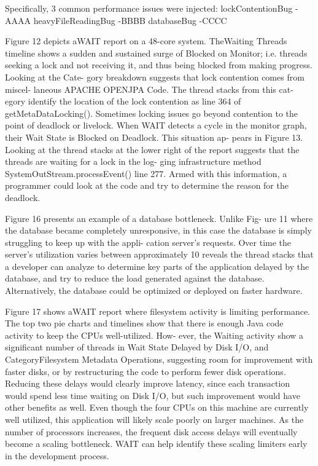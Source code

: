 \documentclass[runningheads,a4paper]{llncs}
\begin{document}
Specifically, 3 common performance issues were injected:
lockContentionBug -AAAA
heavyFileReadingBug -BBBB
databaseBug -CCCC

Figure 12 depicts aWAIT report on a 48-core system. TheWaiting Threads timeline shows a sudden and sustained surge of Blocked on Monitor; i.e. threads seeking a lock and not receiving it, and thus being blocked from making progress. Looking at the Cate- gory breakdown suggests that lock contention comes from miscel- laneous APACHE OPENJPA Code. The thread stacks from this cat- egory identify the location of the lock contention as line 364 of getMetaDataLocking(). Sometimes locking issues go beyond contention to the point of
deadlock or livelock. When WAIT detects a cycle in the monitor graph, their Wait State is Blocked on Deadlock. This situation ap- pears in Figure 13. Looking at the thread stacks at the lower right of the report suggests that the threads are waiting for a lock in the log- ging infrastructure method SystemOutStream.processEvent() line 277. Armed with this information, a programmer could look at the code and try to determine the reason for the deadlock.

Figure 16 presents an example of a database bottleneck. Unlike Fig- ure 11 where the database became completely unresponsive, in this case the database is simply struggling to keep up with the appli- cation server’s requests. Over time the server’s utilization varies between approximately 10%
reveals the thread stacks that a developer can analyze to determine key parts of the application delayed by the database, and try to reduce the load generated against the database. Alternatively, the database could be optimized or deployed on faster hardware.

Figure 17 shows aWAIT report where filesystem activity is limiting performance. The top two pie charts and timelines show that there is enough Java code activity to keep the CPUs well-utilized. How- ever, the Waiting activity show a significant number of threads in Wait State Delayed by Disk I/O, and CategoryFilesystem Metadata Operations, suggesting room for improvement with faster disks, or by restructuring the code to perform fewer disk operations. Reducing these delays would clearly improve latency, since
each transaction would spend less time waiting on Disk I/O, but such improvement
would have other benefits as well. Even though the four CPUs on this machine are currently well utilized, this application will likely scale poorly on larger machines. As the number of processors increases, the frequent disk access delays will eventually become a scaling bottleneck. WAIT can help identify these scaling limiters early in the development process.
\end{document}
